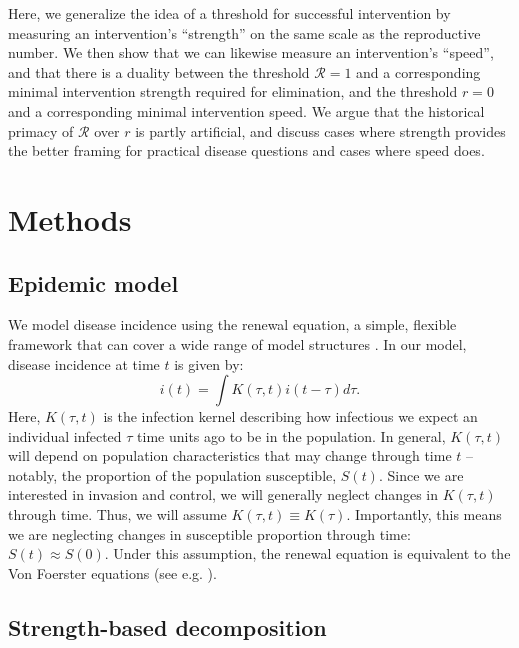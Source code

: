 \documentclass[12pt]{article}
\newcommand{\RR}{\ensuremath{{\mathcal R}}}
\begin{document}
Here, we generalize the idea of a threshold for successful intervention by measuring an intervention's ``strength'' on the same scale as the reproductive number. 
We then show that we can likewise measure an intervention's ``speed'', and that there is a duality between the threshold $\RR=1$ and a corresponding minimal intervention strength required for elimination, and the threshold $r=0$ and a corresponding minimal intervention speed. 
We argue that the historical primacy of $\RR$ over $r$ is partly artificial, and discuss cases where strength provides the better framing for practical disease questions and cases where speed does.

\section{Methods}

\subsection{Epidemic model}

We model disease incidence using the renewal equation, a simple, flexible framework that can cover a wide range of model structures \citep{heesterbeek1996concept, diekmann2000mathematical, roberts2004modelling, aldis2005integral, wallinga2007generation, roberts2007model, Champredon2018equivalence}.
In our model, disease incidence at time $t$ is given by:
\begin{equation}
i(t) = \int K(\tau, t) i(t-\tau) d\tau.
\end{equation}
Here, $K(\tau, t)$ is the infection kernel describing how infectious we expect an individual infected $\tau$ time units ago to be in the population.
In general, $K(\tau, t)$ will depend on population characteristics that may change through time $t$ -- notably, the proportion of the population susceptible, $S(t)$.
Since we are interested in invasion and control, we will generally neglect changes in $K(\tau, t)$ through time.
Thus, we will assume $K(\tau, t) \equiv K(\tau)$.
Importantly, this means we are neglecting changes in susceptible proportion through time: $S(t) \approx S(0)$.
Under this assumption, the renewal equation is equivalent to the Von Foerster equations (see e.g. \cite{fraser2004factors}).

\subsection{Strength-based decomposition}
\end{document}
